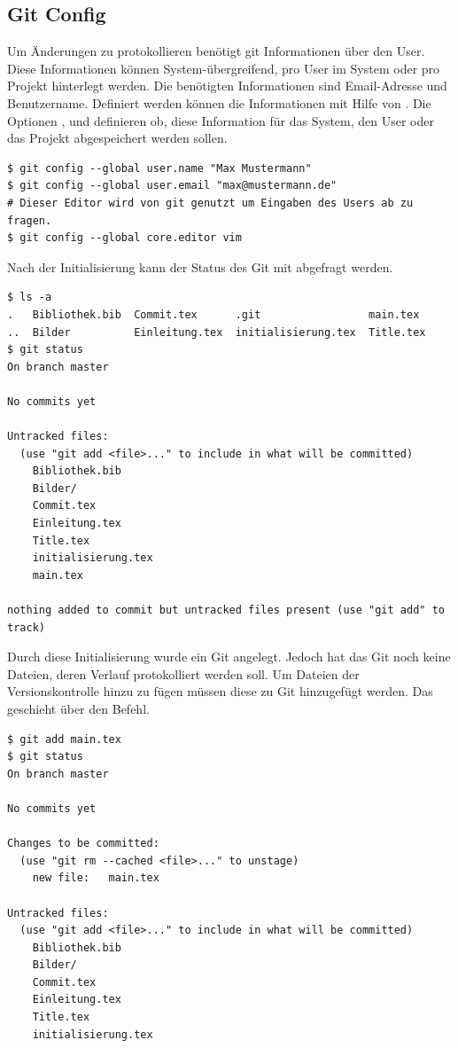 \subsection{Git Config}
Um Änderungen zu protokollieren benötigt git Informationen über den User. Diese Informationen können System-übergreifend, pro User im System oder pro Projekt hinterlegt werden. Die benötigten Informationen sind Email-Adresse und Benutzername. Definiert werden können die Informationen mit Hilfe von . Die Optionen ,  und  definieren ob, diese Information für das System, den User oder das Projekt abgespeichert werden sollen.
\begin{lstlisting}
$ git config --global user.name "Max Mustermann"
$ git config --global user.email "max@mustermann.de"
# Dieser Editor wird von git genutzt um Eingaben des Users ab zu fragen.
$ git config --global core.editor vim  
\end{lstlisting}
Nach der Initialisierung kann der Status des Git mit  abgefragt werden.
\begin{lstlisting}
$ ls -a
.   Bibliothek.bib  Commit.tex      .git                 main.tex
..  Bilder          Einleitung.tex  initialisierung.tex  Title.tex
$ git status
On branch master

No commits yet

Untracked files:
  (use "git add <file>..." to include in what will be committed)
	Bibliothek.bib
	Bilder/
	Commit.tex
	Einleitung.tex
	Title.tex
	initialisierung.tex
	main.tex

nothing added to commit but untracked files present (use "git add" to track)

\end{lstlisting}
Durch diese Initialisierung wurde ein Git angelegt. Jedoch hat das Git noch keine Dateien, deren Verlauf protokolliert werden soll. Um Dateien der Versionskontrolle hinzu zu fügen müssen diese zu Git hinzugefügt werden. Das geschieht über den  Befehl.
\begin{lstlisting}
$ git add main.tex
$ git status
On branch master

No commits yet

Changes to be committed:
  (use "git rm --cached <file>..." to unstage)
	new file:   main.tex

Untracked files:
  (use "git add <file>..." to include in what will be committed)
	Bibliothek.bib
	Bilder/
	Commit.tex
	Einleitung.tex
	Title.tex
	initialisierung.tex
\end{lstlisting}
